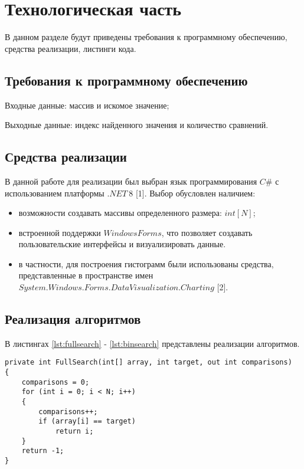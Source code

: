 \chapter{Технологическая часть}

В данном разделе будут приведены требования к программному обеспечению, средства реализации, листинги кода.

\section{Требования к программному обеспечению}

Входные данные: массив и искомое значение;

Выходные данные: индекс найденного значения и количество сравнений.

\section{Средства реализации}
В данной работе для реализации был выбран язык программирования $C\#$ с использованием платформы $.NET\ 8$ [1]. Выбор обусловлен наличием:
\begin{itemize}
    \item возможности создавать массивы определенного размера: $int[N]$;
    \item встроенной поддержки $Windows Forms$, что позволяет создавать пользовательские интерфейсы и визуализировать данные.
    \item в частности, для построения гистограмм были использованы средства, представленные в пространстве имен $System.Windows.Forms.DataVisualization.Charting$ [2].
\end{itemize}

\section{Реализация алгоритмов}

В листингах \ref{lst:fullsearch} - \ref{lst:binsearch} представлены реализации алгоритмов.

\clearpage

\begin{center}
\captionsetup{justification=raggedright,singlelinecheck=off}
\begin{lstlisting}[label=lst:fullsearch,caption=Алгоритм использующий полный перебор]
private int FullSearch(int[] array, int target, out int comparisons)
{
    comparisons = 0;
    for (int i = 0; i < N; i++)
    {
        comparisons++;
        if (array[i] == target)
            return i;
    }
    return -1;
}
\end{lstlisting}
\end{center}


